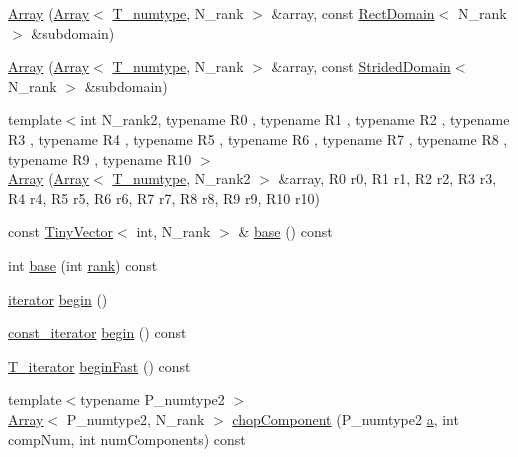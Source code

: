\begin{DoxyCompactItemize}
\item 
\hyperlink{classArray_a9bf897f3f05a46549b72c52768e73c2e}{Array} (\hyperlink{classArray}{Array}$<$ \hyperlink{classArray_ae72770f4a1d2f8b7193badafc320f008}{T\+\_\+numtype}, N\+\_\+rank $>$ \&array, const \hyperlink{classRectDomain}{Rect\+Domain}$<$ N\+\_\+rank $>$ \&subdomain)
\item 
\hyperlink{classArray_a83539a81cc6b318b517cbd8af6bd5ea9}{Array} (\hyperlink{classArray}{Array}$<$ \hyperlink{classArray_ae72770f4a1d2f8b7193badafc320f008}{T\+\_\+numtype}, N\+\_\+rank $>$ \&array, const \hyperlink{classStridedDomain}{Strided\+Domain}$<$ N\+\_\+rank $>$ \&subdomain)
\item 
{\footnotesize template$<$int N\+\_\+rank2, typename R0 , typename R1 , typename R2 , typename R3 , typename R4 , typename R5 , typename R6 , typename R7 , typename R8 , typename R9 , typename R10 $>$ }\\\hyperlink{classArray_a1c73e23e040a25c074e959368847b7d6}{Array} (\hyperlink{classArray}{Array}$<$ \hyperlink{classArray_ae72770f4a1d2f8b7193badafc320f008}{T\+\_\+numtype}, N\+\_\+rank2 $>$ \&array, R0 r0, R1 r1, R2 r2, R3 r3, R4 r4, R5 r5, R6 r6, R7 r7, R8 r8, R9 r9, R10 r10)
\item 
const \hyperlink{classTinyVector}{Tiny\+Vector}$<$ int, N\+\_\+rank $>$ \& \hyperlink{classArray_a979034b77c884359d3022eb773301c47}{base} () const 
\item 
int \hyperlink{classArray_a011a44e3e6e97990198aa621d3fe054c}{base} (int \hyperlink{classArray_a1563c492c1be9d9b95a3f53d9cd89fae}{rank}) const 
\item 
\hyperlink{classArray_a3c33a296e6b0d7290b3f2221660f70f1}{iterator} \hyperlink{classArray_afef13d900474b924dca8dd2f401f8bda}{begin} ()
\item 
\hyperlink{classArray_ad00ebe258c5672331aad96dc6d7299ab}{const\+\_\+iterator} \hyperlink{classArray_a2054b0a114c5f320babdf2260513e67f}{begin} () const 
\item 
\hyperlink{classArray_a6975ccd49584b470e7b952b8acd598f0}{T\+\_\+iterator} \hyperlink{classArray_afd7ebedba352bafaf360826b551585d0}{begin\+Fast} () const 
\item 
{\footnotesize template$<$typename P\+\_\+numtype2 $>$ }\\\hyperlink{classArray}{Array}$<$ P\+\_\+numtype2, N\+\_\+rank $>$ \hyperlink{classArray_aad48022bf24bc61499331bba67915d3e}{chop\+Component} (P\+\_\+numtype2 \hyperlink{gen__mat5files_8m_aae328bf20413f220e38aec4d95bfd6da}{a}, int comp\+Num, int num\+Components) const 

\end{DoxyCompactItemize}
